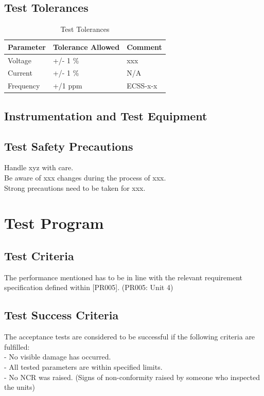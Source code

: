 \documentclass[12pt,a4paper,numbers=endperiod]{article}
\begin{document}
\subsection{Test Tolerances}
\begin{table}[H]
	\centering
	\caption{Test Tolerances}
	\begin{tabular}{lll}
		\toprule
		Parameter & Tolerance Allowed & Comment\\
		\midrule
		Voltage & +/- 1 \% & xxx\\
		Current & +/- 1 \% & N/A\\
	Frequency & +/1 ppm & ECSS-x-x \\
		\bottomrule
	\end{tabular}
	\label{t:Tolerance}
\end{table}

\subsection{Instrumentation and Test Equipment}
\subsection{Test Safety Precautions}
Handle xyz with care.\\
Be aware of xxx changes during the process of xxx.\\
Strong precautions need to be taken for xxx.
\newpage
\section{Test Program}
\subsection{Test Criteria}
The performance mentioned has to be in line with the relevant requirement specification defined within [PR005]. (PR005: Unit 4)
\subsection{Test Success Criteria}
The acceptance tests are considered to be successful if the following criteria are fulfilled:\\
- No visible damage has occurred. \\ 
- All tested parameters are within specified limits.\\
- No NCR was raised. (Signs of non-conformity raised by someone who inspected the units)
\end{document}
